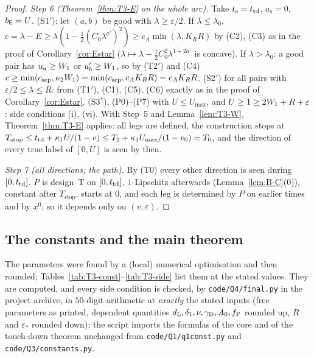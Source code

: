 \begin{proof}
\emph{Step 6 (Theorem~\ref{thm:T3-E} on the whole arc).} Take $t_{\mathrm s}=t_{\mathrm{td}}$, $a_{\mathrm s}=0$, $b_{\mathsf E}=U$. (S1$'$): let $(a,b)$ be good
with $\lambda\ge\varepsilon/2$. If $\lambda\le\lambda_0$, $c=\lambda-E\ge\lambda(1-\frac12(C_0\lambda^{a'})^2)\ge c_A\min(\lambda,K_RR)$ by
(C2), (C3) as in the proof of Corollary~\ref{cor:Estar} ($\lambda\mapsto\lambda-\frac12C_0^2\lambda^{1+2a'}$ is concave). If
$\lambda>\lambda_0$: a good pair has $u_a\ge W_1$ or $u_b'\ge W_1$, so by (T2$'$) and (C4)
$c\ge\min(c_{\mathrm{sep}},\kappa_2W_1)=\min(c_{\mathrm{sep}},c_AK_RR)=c_AK_RR$. (S2$'$) for all pairs with $\varepsilon/2\le\lambda\le R$:
from (T1$'$), (C1), (C5), (C6) exactly as in the proof of Corollary~\ref{cor:Estar}. (S3$^*$), (P0)--(P7) with $U\le U_{\max}$, and
$U\ge1\ge2W_1+R+\varepsilon$: side conditions (i), (vi). With Step~5 and Lemma~\ref{lem:T3-W}, Theorem~\ref{thm:T3-E} applies: all
legs are defined, the construction stops at $T_{\mathrm{stop}}\le t_{\mathrm{td}}+\kappa_1U/(1-v)\le T_2+\kappa_1U_{\max}/(1-v_0)=T_0$, and the
direction of every true label of $[0,U]$ is seen by then.

\emph{Step 7 (all directions; the path).} By (T0) every other direction is seen during $[0,t_{\mathrm{td}}]$. $P$ is design~T on $[0,t_{\mathrm{td}}]$,
$1$-Lipschitz afterwards (Lemma~\ref{lem:B-C}(0)), constant after $T_{\mathrm{stop}}$, starts at $0$, and each leg is determined
by $P$ on earlier times and by $x^0$; so it depends only on $(v,\varepsilon)$.
\end{proof}

\subsection{The constants and the main theorem}

The parameters were found by a (local) numerical optimisation and then rounded; Tables~\ref{tab:T3-const}--\ref{tab:T3-side} list
them at the stated values. They are computed, and every side condition is checked, by \texttt{code/Q4/final.py} in the project
archive, in $50$-digit arithmetic at \emph{exactly} the stated inputs (free parameters as printed, dependent quantities
$d_{\mathrm L},\delta_1,\nu,\gamma_{\mathrm D},A_0,f_{\mathrm F}$ rounded up, $R$ and $\varepsilon_*$ rounded down); the script imports the formulas of the core and of the
touch-down theorem unchanged from \texttt{code/Q1/q1const.py} and \texttt{code/Q3/constants.py}.

